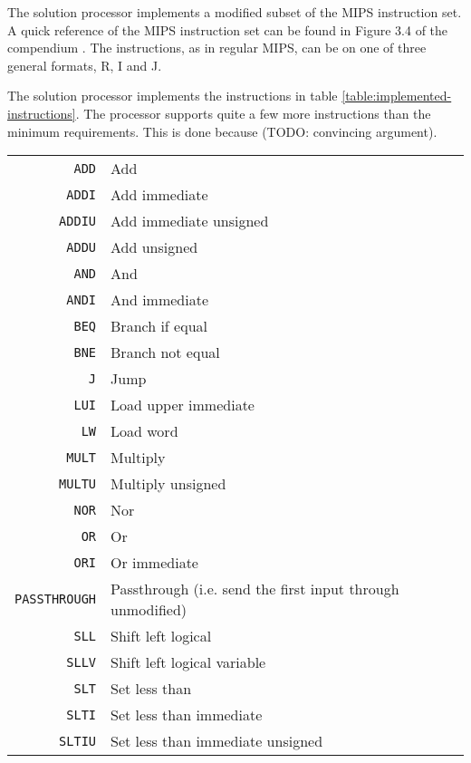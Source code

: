 The solution processor implements a modified subset of the MIPS instruction set.
A quick reference of the MIPS instruction set can be found in Figure 3.4 of the compendium \cite{compendium}.
The instructions, as in regular MIPS, can be on one of three general formats, R, I and J.

The solution processor implements the instructions in table \ref{table:implemented-instructions}.
The processor supports quite a few more instructions than the minimum requirements.
This is done because (TODO: convincing argument).

\begin{table}
    \begin{center}
        \begin{tabular}{r|l}
            \texttt{ADD} & Add \\
            \texttt{ADDI} & Add immediate \\
            \texttt{ADDIU} & Add immediate unsigned \\
            \texttt{ADDU} & Add unsigned \\
            \texttt{AND} & And \\
            \texttt{ANDI} & And immediate \\
            \texttt{BEQ} & Branch if equal \\
            \texttt{BNE} & Branch not equal \\
            \texttt{J} & Jump \\
            \texttt{LUI} & Load upper immediate \\
            \texttt{LW} & Load word \\
            \texttt{MULT} & Multiply \\
            \texttt{MULTU} & Multiply unsigned \\
            \texttt{NOR} & Nor \\
            \texttt{OR} & Or \\
            \texttt{ORI} & Or immediate \\
            \texttt{PASSTHROUGH} & Passthrough (i.e. send the first input through unmodified) \\
            \texttt{SLL} & Shift left logical \\
            \texttt{SLLV} & Shift left logical variable \\
            \texttt{SLT} & Set less than \\
            \texttt{SLTI} & Set less than immediate \\
            \texttt{SLTIU} & Set less than immediate unsigned \\

\end{tabular}
\end{center}
\end{table}
